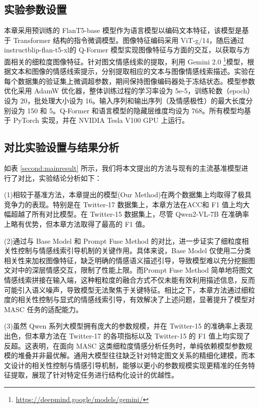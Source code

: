 \subsection{实验参数设置}
本章采用预训练的 FlanT5-base 模型\cite{chung2024scaling}作为语言模型以编码文本特征，该模型是基于 Transformer 结构的指令微调模型\cite{colin2020exploring}。图像特征编码采用 ViT-g/14\cite{fang2023eva}，随后通过 instructblip-flan-t5-xl\cite{dai2023instructblip}的 Q-Former 模型实现图像特征与方面的交互，以获取与方面相关的细粒度图像特征。针对图文情感线索的提取，利用 Gemini 2.0 \footnote{\url{https://deepmind.google/models/gemini/}}模型，根据文本和图像的情感线索提示，分别提取相应的文本与图像情感线索描述。实验在每个数据集的验证集上微调超参数，期间保持图像编码器处于冻结状态。模型参数优化采用 AdamW 优化器\cite{loshchilov2017decoupled}，整体训练过程的学习率设为 5e-5，训练轮数（epoch）设为 20，批处理大小设为 16。输入序列和输出序列（及情感极性）的最大长度分别设为 150 和 5。Q-Former 和语言模型的隐藏层维度均设为 768。所有模型均基于 PyTorch 实现，并在 NVIDIA Tesla V100 GPU 上运行。


\subsection{对比实验设置与结果分析}
如表 \ref{second:mainresult} 所示，我们将本文提出的方法与现有的主流基准模型进行了对比，实验结论分析如下：

(1)相较于基准方法，本章提出的模型(Our Method)在两个数据集上均取得了极具竞争力的表现。特别是在 Twitter-17 数据集上，本章方法在ACC和 F1 值上均大幅超越了所有对比模型。在 Twitter-15 数据集上，尽管 Qwen2-VL-7B 在准确率上略有优势，但本章方法取得了最高的 F1 值。

(2)通过与 Base Model 和 Prompt Fuse Method 的对比，进一步证实了细粒度相关性控制与情感线索引导机制的关键作用。具体来说，Base Model 仅使用二分类相关性来加权图像特征，缺乏明确的情感语义描述引导，导致模型难以充分挖掘图文对中的深层情感交互，限制了性能上限。而Prompt Fuse Method 简单地将图文情感线索拼接在输入端，这种粗粒度的融合方式不仅未能有效利用描述信息，反而可能引入语义噪声，导致模型无法聚焦于关键特征。相比之下，本章方法通过细粒度的相关性控制与显式的情感线索引导，有效解决了上述问题，显著提升了模型对 MASC 任务的适配能力。

(3)虽然 Qwen 系列大模型拥有庞大的参数规模，并在 Twitter-15 的准确率上表现出色，但本章方法在 Twitter-17 的各项指标以及 Twitter-15 的 F1 值上均实现了反超。这表明，在面向 MASC 这类细粒度情感分析任务时，单纯依赖模型参数规模的堆叠并非最优解。通用大模型往往缺乏针对特定图文关系的精细化建模，而本文设计的相关性控制与情感引导机制，能够以更小的参数规模实现更精准的任务特征提取，展现了针对特定任务进行结构化设计的优越性。

